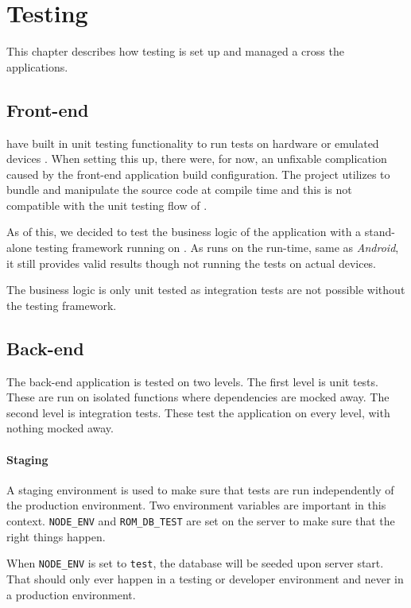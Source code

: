 \chapter{Testing}
This chapter describes how testing is set up and managed a cross the applications.

\section{Front-end}
 have built in unit testing functionality to run tests on hardware or emulated devices \citep{testing:nativescript}.
When setting this up, there were, for now, an unfixable complication caused by the front-end application build configuration.
The project utilizes  to bundle and manipulate the source code at compile time and this is not compatible with the  unit testing flow of .

As of this, we decided to test the business logic of the application with a stand-alone testing framework running on .
As  runs on the  run-time, same as \textit{Android}, it still provides valid results though not running the tests on actual devices.

The business logic is only unit tested as integration tests are not possible without the  testing framework.

\section{Back-end}
The back-end application is tested on two levels.
The first level is unit tests.
These are run on isolated functions where dependencies are mocked away.
The second level is integration tests.
These test the application on every level, with nothing mocked away. 

\subsubsection{Staging}
A staging environment is used to make sure that tests are run independently of the production environment. 
Two environment variables are important in this context.
\verb+NODE_ENV+ and \verb+ROM_DB_TEST+ are set on the  server to make sure that the right things happen.

When \verb+NODE_ENV+ is set to \verb+test+, the database will be seeded upon server start.
That should only ever happen in a testing or developer environment and never in a production environment.

